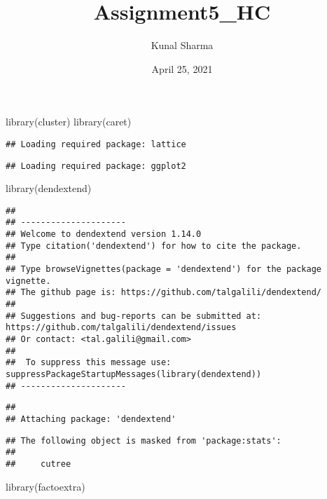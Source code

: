 \documentclass[
]{article}
\title{Assignment5\_HC}
\author{Kunal Sharma}
\date{April 25, 2021}
\newenvironment{Shaded}{\begin{snugshade}}{\end{snugshade}}
\newcommand{\FunctionTok}[1]{\textcolor[rgb]{0.00,0.00,0.00}{#1}}
\newcommand{\NormalTok}[1]{#1}
\begin{document}
\maketitle

\begin{Shaded}
\begin{Highlighting}[]
\FunctionTok{library}\NormalTok{(cluster)}
\FunctionTok{library}\NormalTok{(caret)}
\end{Highlighting}
\end{Shaded}

\begin{verbatim}
## Loading required package: lattice
\end{verbatim}

\begin{verbatim}
## Loading required package: ggplot2
\end{verbatim}

\begin{Shaded}
\begin{Highlighting}[]
\FunctionTok{library}\NormalTok{(dendextend)}
\end{Highlighting}
\end{Shaded}

\begin{verbatim}
## 
## ---------------------
## Welcome to dendextend version 1.14.0
## Type citation('dendextend') for how to cite the package.
## 
## Type browseVignettes(package = 'dendextend') for the package vignette.
## The github page is: https://github.com/talgalili/dendextend/
## 
## Suggestions and bug-reports can be submitted at: https://github.com/talgalili/dendextend/issues
## Or contact: <tal.galili@gmail.com>
## 
##  To suppress this message use:  suppressPackageStartupMessages(library(dendextend))
## ---------------------
\end{verbatim}

\begin{verbatim}
## 
## Attaching package: 'dendextend'
\end{verbatim}

\begin{verbatim}
## The following object is masked from 'package:stats':
## 
##     cutree
\end{verbatim}

\begin{Shaded}
\begin{Highlighting}[]
\FunctionTok{library}\NormalTok{(factoextra)}
\end{Highlighting}
\end{Shaded}
\end{document}
